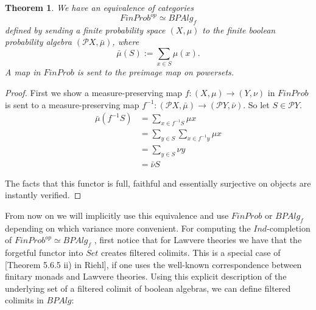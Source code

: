 \documentclass[a4paper]{amsproc}
\theoremstyle{plain}
\newtheorem{theorem}{Theorem}[section]
\theoremstyle{definition}
\theoremstyle{remark}
\numberwithin{equation}{section}
\begin{document}
\begin{theorem}\label{Imnotdumb} We have an equivalence of categories
\[
FinProb^{op} \simeq BPAlg_f
\]
defined by sending a finite probability space $(X, \mu)$ to the finite boolean probability algebra $(\mathcal{P} X, \bar{\mu})$, where
\[
\bar{\mu}(S) := \sum_{x \in S} \mu(x).
\]
A map in $FinProb$ is sent to the preimage map on powersets.
\end{theorem}
\begin{proof}
First we show a measure-preserving map $f: (X,\mu) \to (Y,\nu)$ in $FinProb$ is sent to a measure-preserving map $f^{-1}: (\mathcal{P}X, \bar{\mu}) \to (\mathcal{P}Y, \bar{\nu})$. So let $S \in \mathcal{P} Y$.
\begin{align*}
\bar{\mu}(f^{-1} S) &= \sum_{x \in f^{-1} S} \mu x \\
&= \sum_{y \in S} \sum_{x \in f^{-1} y} \mu x \\
&= \sum_{y \in S} \nu y \\
&= \bar{\nu} S
\end{align*}

The facts that this functor is full, faithful and essentially surjective on objects are instantly verified.
\end{proof}

From now on we will implicitly use this equivalence and use $FinProb$ or $BPAlg_f$ depending on which variance more convenient.
For computing the $Ind$-completion of $FinProb^{op} \simeq BPAlg_f$ , first notice that for Lawvere theories we have that the forgetful functor into $Set$ creates filtered colimits. This is a special case of [Theorem 5.6.5 ii) in Riehl], if one uses the well-known correspondence between finitary monads and Lawvere theories. Using this explicit description of the underlying set of a filtered colimit of boolean algebras, we can define filtered colimits in $BPAlg$:
\end{document}
